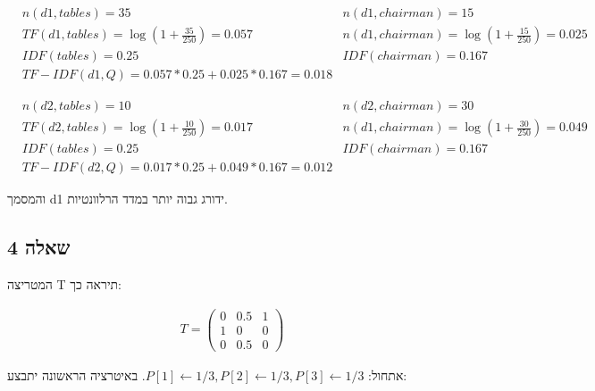 \documentclass{article}
\begin{document}
\begin{align*}
     & n(d1,tables) =35                                   & n(d1,chairman)=15                            \\
     & TF(d1,tables) =\log(1+\frac{35}{250})=0.057        & n(d1, chairman)=\log(1+\frac{15}{250})=0.025 \\
     & IDF(tables)=0.25                                   & IDF(chairman)=0.167                          \\
     & TF-IDF(d1, Q)=0.057 * 0.25 + 0.025 * 0.167 = 0.018
\end{align*}

\begin{align*}
     & n(d2,tables) =10                                                     & n(d2,chairman)=30                            \\
     & TF(d2,tables) =\log(1+\frac{10}{250})=0.017                          & n(d1, chairman)=\log(1+\frac{30}{250})=0.049 \\
     & IDF(tables)=0.25                                                     & IDF(chairman)=0.167                          \\
     & TF-IDF(d2, Q)=0.017 * 0.25                   + 0.049 * 0.167 = 0.012
\end{align*}

\begin{hebrew}

    והמסמך d1 ידורג גבוה יותר במדד הרלוונטיות.

\end{hebrew}

\pagebreak

\begin{hebrew}
    \section*{שאלה 4}
    המטריצה T תיראה כך:
\end{hebrew}
\begin{align*}
    T=\begin{pmatrix}
          0 & 0.5 & 1 \\
          1 & 0   & 0 \\
          0 & 0.5 & 0
      \end{pmatrix}
\end{align*}
\begin{hebrew}
    אתחול: $P[1]\leftarrow 1/3, P[2]\leftarrow 1/3, P[3]\leftarrow 1/3$.
    באיטרציה הראשונה יתבצע:
\end{hebrew}
\end{document}
